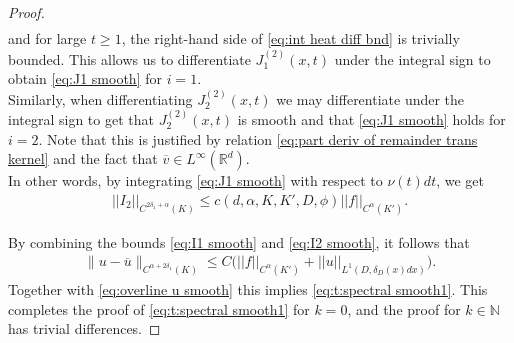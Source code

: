 \documentclass[12pt,a4paper,onecolumn]{amsart}
\theoremstyle{definition}
\newcommand{\R}{\mathbb{R}}
\newcommand{\N}{\mathbb{N}}
\newcommand{\1}{\mathbf 1}
\newcommand{\LLL}{L^1(D,\de(x)dx)}
\newcommand{\de}{\delta_D}
\numberwithin{equation}{section}
\begin{document}
\begin{proof}
\begin{align*}
\end{align*}
and for large $t\ge 1$, the right-hand side of \eqref{eq:int heat diff bnd} is trivially bounded.
This allows us to differentiate $J^{(2)}_1(x,t)$ under the integral sign to obtain \eqref{eq:J1 smooth} for $i=1$.\\
Similarly, when differentiating $J^{(2)}_2(x,t)$ we may differentiate under the integral sign to get that $J^{(2)}_2(x,t)$ is smooth and that \eqref{eq:J1 smooth} holds for $i=2$. Note that this is justified by relation \eqref{eq:part deriv of remainder trans kernel} and the fact that $\overline v\in L^\infty(\R^d)$. \\
In other words, by integrating \eqref{eq:J1 smooth} with respect to $\nu(t)dt$, we get 
\begin{align}\label{eq:I2 smooth}
            ||I_2||_{C^{2\delta_1+\alpha}(K)}\le c(d,\alpha,K,K',D,\phi)||f||_{C^{\alpha}(K')}.
	\end{align}
 
By combining the bounds \eqref{eq:I1 smooth} and \eqref{eq:I2 smooth}, it follows that
\begin{align*}
    \|u-\overline{u}\|_{C^{\alpha+2\delta_1}(K)}\le C\big(||f||_{C^{\alpha}(K')}+||u||_{\LLL}\big).
\end{align*}
Together with \eqref{eq:overline u smooth} this implies \eqref{eq:t:spectral smooth1}. This completes the proof of \eqref{eq:t:spectral smooth1} for $k=0$, and the proof for $k\in \N$ has trivial differences.


\end{proof}
\end{document}
